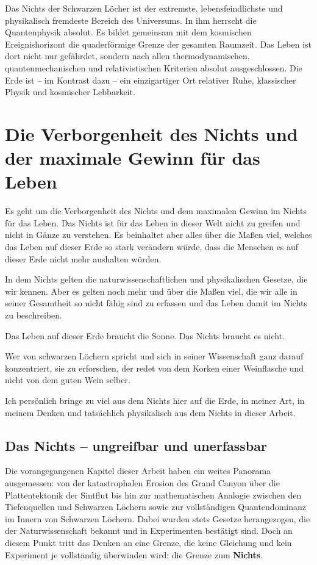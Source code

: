 ﻿\documentclass[12pt,a4paper]{report}
\begin{document}
Das Nichts der Schwarzen Löcher ist der extremste, lebensfeindlichste und
physikalisch fremdeste Bereich des Universums. In ihm herrscht die Quantenphysik absolut. Es bildet gemeinsam mit dem kosmischen Ereignishorizont die quaderförmige Grenze der gesamten Raumzeit. Das Leben ist dort nicht nur gefährdet, sondern nach allen thermodynamischen, quantenmechanischen und
relativistischen Kriterien absolut ausgeschlossen. Die Erde ist -- im Kontrast dazu -- ein einzigartiger Ort relativer Ruhe, klassischer Physik und kosmischer Lebbarkeit.

\chapter{Die Verborgenheit des Nichts und der maximale Gewinn für das Leben}
\label{sec:verborgenheit_nichts}

Es geht um die Verborgenheit des Nichts und dem maximalen Gewinn im Nichts für das Leben.
Das Nichts ist für das Leben in dieser Welt nicht zu greifen und nicht in Gänze zu verstehen.
Es beinhaltet aber alles über die Maßen viel, welches das Leben auf dieser Erde so stark
verändern würde, dass die Menschen es auf dieser Erde nicht mehr aushalten würden.

In dem Nichts gelten die naturwissenschaftlichen und physikalischen Gesetze, die wir kennen.
Aber es gelten noch mehr und über die Maßen viel, die wir alle in seiner Gesamtheit so nicht
fähig sind zu erfassen und das Leben damit im Nichts zu beschreiben.

Das Leben auf dieser Erde braucht die Sonne. Das Nichts braucht es nicht.

Wer von schwarzen Löchern spricht und sich in seiner Wissenschaft ganz darauf konzentriert,
sie zu erforschen, der redet von dem Korken einer Weinflasche und nicht von dem guten Wein selber.

Ich persönlich bringe zu viel aus dem Nichts hier auf die Erde, in meiner Art, in meinem Denken
und tatsächlich physikalisch aus dem Nichts in dieser Arbeit.

\section{Das Nichts -- ungreifbar und unerfassbar}

Die vorangegangenen Kapitel dieser Arbeit haben ein weites Panorama ausgemessen: von der katastrophalen Erosion des Grand Canyon über die Plattentektonik der Sintflut bis hin zur mathematischen Analogie zwischen den Tiefenquellen und Schwarzen Löchern sowie zur vollständigen Quantendominanz im Innern von Schwarzen Löchern. Dabei wurden stets Gesetze herangezogen, die der Naturwissenschaft bekannt und in Experimenten bestätigt sind. Doch an diesem Punkt tritt das Denken an eine Grenze, die keine Gleichung und kein Experiment je vollständig überwinden wird: die Grenze zum \textbf{Nichts}.
\end{document}
